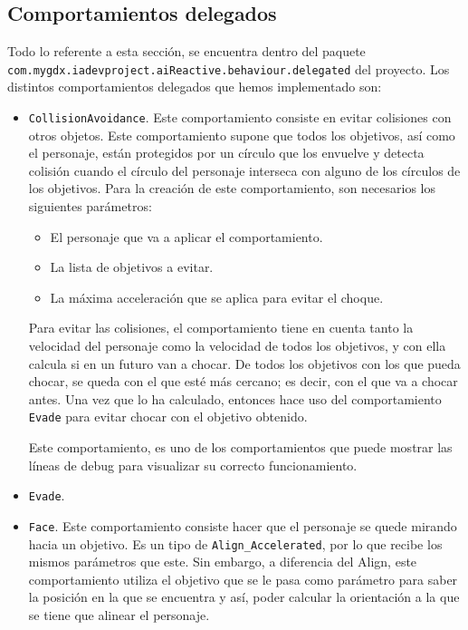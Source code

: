 \subsection{Comportamientos delegados}
Todo lo referente a esta sección, se encuentra dentro del paquete \\ \texttt{com.mygdx.iadevproject.aiReactive.behaviour.delegated} del proyecto. Los distintos comportamientos delegados que hemos implementado son:
\begin{itemize}
 \item \texttt{CollisionAvoidance}. Este comportamiento consiste en evitar colisiones con otros objetos. Este comportamiento supone que todos los objetivos, así como el personaje, están protegidos por un círculo que los envuelve y detecta colisión cuando el círculo del personaje interseca con alguno de los círculos de los objetivos. Para la creación de este comportamiento, son necesarios los siguientes parámetros:
 \begin{itemize}
  \item El personaje que va a aplicar el comportamiento.
  \item La lista de objetivos a evitar.
  \item La máxima acceleración que se aplica para evitar el choque.
 \end{itemize}
 Para evitar las colisiones, el comportamiento tiene en cuenta tanto la velocidad del personaje como la velocidad de todos los objetivos, y con ella calcula si en un futuro van a chocar. De todos los objetivos con los que pueda chocar, se queda con el que esté más cercano; es decir, con el que va a chocar antes. Una vez que lo ha calculado, entonces hace uso del comportamiento \texttt{Evade} para evitar chocar con el objetivo obtenido. 
 
 Este comportamiento, es uno de los comportamientos que puede mostrar las líneas de debug para visualizar su correcto funcionamiento. 
  
  
 \item \texttt{Evade}.
 
 
 \item \texttt{Face}. Este comportamiento consiste hacer que el personaje se quede mirando hacia un objetivo. Es un tipo de \texttt{Align\_Accelerated}, por lo que recibe los mismos parámetros que este. Sin embargo, a diferencia del Align, este comportamiento utiliza el objetivo que se le pasa como parámetro para saber la posición en la que se encuentra y así, poder calcular la orientación a la que se tiene que alinear el personaje.
 

\end{itemize}
